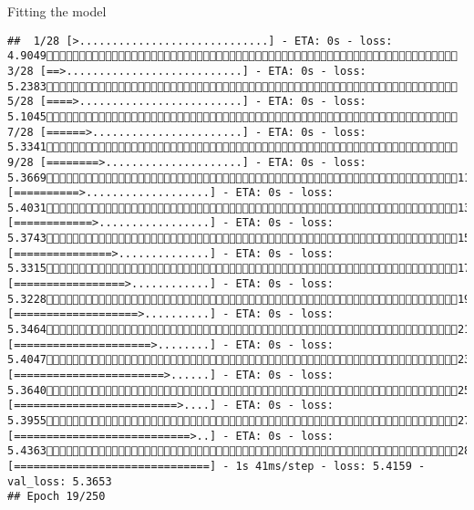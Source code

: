 \documentclass[
  ignorenonframetext,
]{beamer}
\begin{document}
\begin{frame}[fragile]{Fitting the model}
\begin{verbatim}
##  1/28 [>.............................] - ETA: 0s - loss: 4.9049 3/28 [==>...........................] - ETA: 0s - loss: 5.2383 5/28 [====>.........................] - ETA: 0s - loss: 5.1045 7/28 [======>.......................] - ETA: 0s - loss: 5.3341 9/28 [========>.....................] - ETA: 0s - loss: 5.366911/28 [==========>...................] - ETA: 0s - loss: 5.403113/28 [============>.................] - ETA: 0s - loss: 5.374315/28 [===============>..............] - ETA: 0s - loss: 5.331517/28 [=================>............] - ETA: 0s - loss: 5.322819/28 [===================>..........] - ETA: 0s - loss: 5.346421/28 [=====================>........] - ETA: 0s - loss: 5.404723/28 [=======================>......] - ETA: 0s - loss: 5.364025/28 [=========================>....] - ETA: 0s - loss: 5.395527/28 [===========================>..] - ETA: 0s - loss: 5.436328/28 [==============================] - 1s 41ms/step - loss: 5.4159 - val_loss: 5.3653
## Epoch 19/250

\end{verbatim}
\end{frame}
\end{document}
